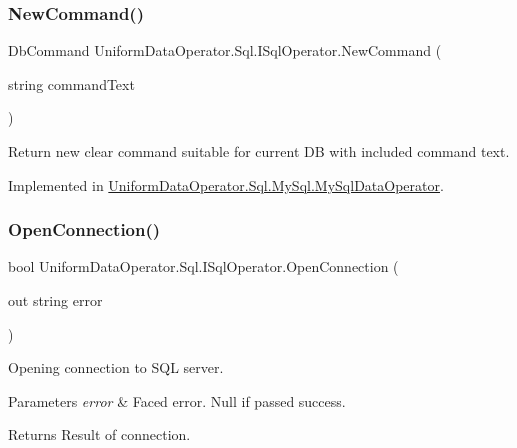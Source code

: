 \subsubsection{\texorpdfstring{New\+Command()}{NewCommand()}\hspace{0.1cm}{\footnotesize\ttfamily [2/2]}}
{\footnotesize\ttfamily Db\+Command Uniform\+Data\+Operator.\+Sql.\+I\+Sql\+Operator.\+New\+Command (\begin{DoxyParamCaption}\item[{string}]{command\+Text }\end{DoxyParamCaption})}



Return new clear command suitable for current DB with included command text. 



Implemented in \mbox{\hyperlink{class_uniform_data_operator_1_1_sql_1_1_my_sql_1_1_my_sql_data_operator_a6c2e2d374072c275953a515379963881}{Uniform\+Data\+Operator.\+Sql.\+My\+Sql.\+My\+Sql\+Data\+Operator}}.

\mbox{\label{interface_uniform_data_operator_1_1_sql_1_1_i_sql_operator_a6fc9e5efd1e21ae9998b9c56ae9e347c}} 
\subsubsection{\texorpdfstring{Open\+Connection()}{OpenConnection()}}
{\footnotesize\ttfamily bool Uniform\+Data\+Operator.\+Sql.\+I\+Sql\+Operator.\+Open\+Connection (\begin{DoxyParamCaption}\item[{out string}]{error }\end{DoxyParamCaption})}



Opening connection to S\+QL server. 


\begin{DoxyParams}{Parameters}
{\em error} & Faced error. Null if passed success.\\
\hline
\end{DoxyParams}
\begin{DoxyReturn}{Returns}
Result of connection.
\end{DoxyReturn}


